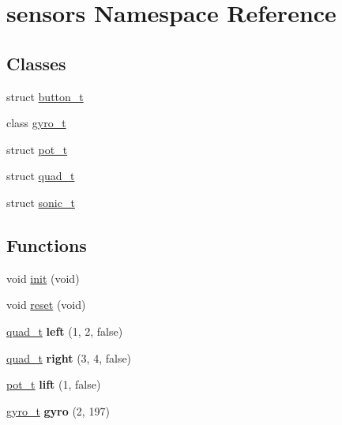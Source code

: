 \hypertarget{namespacesensors}{}\section{sensors Namespace Reference}
\label{namespacesensors}
\subsection*{Classes}
\begin{DoxyCompactItemize}
\item 
struct \hyperlink{structsensors_1_1button__t}{button\+\_\+t}
\item 
class \hyperlink{classsensors_1_1gyro__t}{gyro\+\_\+t}
\item 
struct \hyperlink{structsensors_1_1pot__t}{pot\+\_\+t}
\item 
struct \hyperlink{structsensors_1_1quad__t}{quad\+\_\+t}
\item 
struct \hyperlink{structsensors_1_1sonic__t}{sonic\+\_\+t}
\end{DoxyCompactItemize}
\subsection*{Functions}
\begin{DoxyCompactItemize}
\item 
void \hyperlink{namespacesensors_a044693d89baff38c98f863ee503cde2e}{init} (void)
\item 
void \hyperlink{namespacesensors_a5d5bcadf00164a9db189d9bfa8d9dbb3}{reset} (void)
\item 
\mbox{\label{namespacesensors_ad7f873d16ad074c11f1e4c4f474be8ba}} 
\hyperlink{structsensors_1_1quad__t}{quad\+\_\+t} {\bfseries left} (1, 2, false)
\item 
\mbox{\label{namespacesensors_a53537b79680b539c5312bab3bf7d2eb8}} 
\hyperlink{structsensors_1_1quad__t}{quad\+\_\+t} {\bfseries right} (3, 4, false)
\item 
\mbox{\label{namespacesensors_aadc3d3ede9ae5dc9a3c25bf89a113268}} 
\hyperlink{structsensors_1_1pot__t}{pot\+\_\+t} {\bfseries lift} (1, false)
\item 
\mbox{\label{namespacesensors_a76c3057efa993dfa91cf8870ea7c99e0}} 
\hyperlink{classsensors_1_1gyro__t}{gyro\+\_\+t} {\bfseries gyro} (2, 197)
\end{DoxyCompactItemize}
